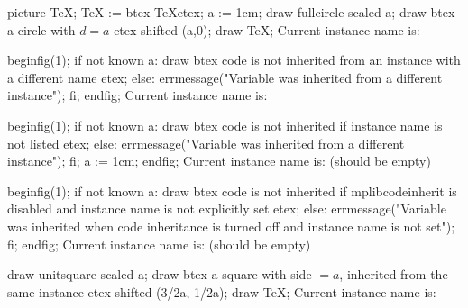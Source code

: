 \baselineskip
{}

\mplibcode[instanceOne]
  picture TeX;
  TeX := btex \TeX etex;
a := 1cm;
draw fullcircle scaled a;
draw btex a circle with $d=a$ etex shifted (a,0);
draw TeX;
\endmplibcode
Current instance name is: \currentmpinstancename {}\baselineskip

\mplibcode[instanceTwo]
beginfig(1);
if not known a:
  draw btex code is not inherited from an instance with a different name etex;
else:
  errmessage("Variable was inherited from a different instance");
fi;
endfig;
\endmplibcode
Current instance name is: \currentmpinstancename {}\baselineskip

\mplibcode
beginfig(1);
if not known a:
  draw btex code is not inherited if instance name is not listed etex;
else:
  errmessage("Variable was inherited from a different instance");
fi;
a := 1cm;
endfig;
\endmplibcode
Current instance name is: \currentmpinstancename (should be empty) \baselineskip

\mplibcode
beginfig(1);
if not known a:
  draw btex code is not inherited if mplibcodeinherit is disabled and instance name is not explicitly set etex;
else:
  errmessage("Variable was inherited when code inheritance is turned off and instance name is not set");
fi;
endfig;
\endmplibcode
Current instance name is: \currentmpinstancename (should be empty) \baselineskip

\mplibcode[instanceOne]
draw unitsquare scaled a;
draw btex a square with side $=a$, inherited from the same instance etex shifted (3/2a, 1/2a);
  draw TeX;
\endmplibcode
Current instance name is: \currentmpinstancename {}\baselineskip

\bye
